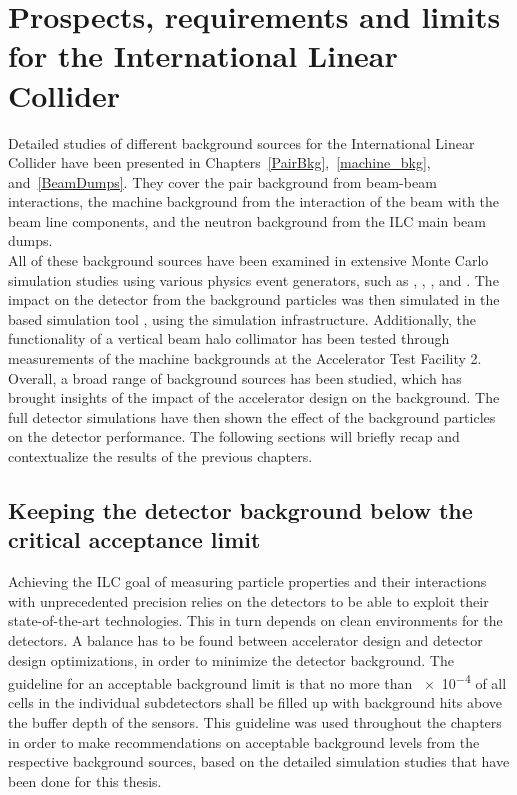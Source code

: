 \chapter{Prospects, requirements and limits for the International Linear Collider}
\label{Results}
Detailed studies of different background sources for the International Linear Collider have been presented in Chapters~\ref{PairBkg},~\ref{machine_bkg}, and~\ref{BeamDumps}.
They cover the \positron\electron pair background from beam-beam interactions, the machine background from the interaction of the beam with the beam line components, and the neutron background from the ILC main beam dumps.
\\All of these background sources have been examined in extensive Monte Carlo simulation studies using various physics event generators, such as \guineapig, \mucarlo, \bdsim, and \fluka.
The impact on the \sid detector from the background particles was then simulated in the \geant based simulation tool \slic, using the \sid simulation infrastructure.
Additionally, the functionality of a vertical beam halo collimator has been tested through measurements of the machine backgrounds at the Accelerator Test Facility 2.
\\Overall, a broad range of background sources has been studied, which has brought insights of the impact of the accelerator design on the background.
The full detector simulations have then shown the effect of the background particles on the \sid detector performance.
The following sections will briefly recap and contextualize the results of the previous chapters.

\section{Keeping the detector background below the critical acceptance limit}
Achieving the ILC goal of measuring particle properties and their interactions with unprecedented precision relies on the detectors to be able to exploit their state-of-the-art technologies.
This in turn depends on clean environments for the detectors.
A balance has to be found between accelerator design and detector design optimizations, in order to minimize the detector background.
The \sid guideline for an acceptable background limit is that no more than \num{e-4} of all cells in the individual subdetectors shall be filled up with background hits above the buffer depth of the sensors.
This guideline was used throughout the chapters in order to make recommendations on acceptable background levels from the respective background sources, based on the detailed simulation studies that have been done for this thesis.

